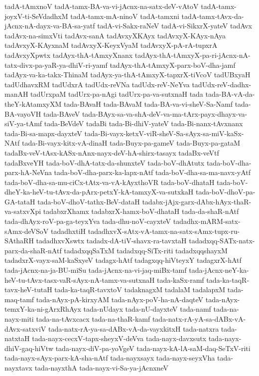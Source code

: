 {tadA-tAmxnoV
tadA-tamx-BA-va-vi-jAcnx-na-satx-deV-vAtoV
tadA-tamx-joyxV-ti-SeVdadhxM
tadA-tamx-mA-ninoV
tadA-tamxni
tadA-tamx-tAvx-da-jAcnx-nA-dayx-va-BA-sa-yatf
tadA-vi-Sakx-raNeV
tadA-vi-SikxrX-yateV
tadAvx
tadAvx-na-simxVti
tadAvx-sanA
tadAvxyXKAyx
tadAvxyX-KAyx-nAya
tadAvxyX-KAyxnaM
tadAvxyX-KeyxVyaM
tadAvxyX-pA-rA-tupxrA
tadAvxyXpwtx
tadAyx-thA-tAmxyXnanx
tadAyx-thA-tAmxyX-pa-ri-jAcnx-nA-tatx-divx-pa-yaR-ya-dhiV-ri-yamf
tadAyx-thA-tAmxyX-parx-boV-dha-jamf
tadAyx-va-ka-takx-ThinaM
tadAyx-ya-thA-tAmxyX-tapxrX-tiVcoV
tadUBxyaH
tadUdhavxRM
tadUdxrA
tadUdx-reVNa
tadUdx-reV-NeYva
tadUdx-reV-dadhx-manAH
tadUrxpaM
tadUrx-pa-nAgi
tadUrx-pa-va-sutxnaH
tada
tada-BA-vA-da-theY-kAtamxyXM
tada-BAvaH
tada-BAvaM
tada-BA-va-vi-sheV-Sa-Namf
tada-BA-vayoVH
tada-BAveV
tada-BAyx-sa-va-shA-deV-va-ma-tArx-payx-dhayx-va-siV-ya-tAmf
tada-BeVdeV
tadaBi
tada-Bi-dhiV-yateV
tada-Bi-nanx-tAvxnanx
tada-Bi-sa-mapx-dayxteV
tada-Bi-vayx-ketxV-viR-sheV-Sa-sAyx-sa-miV-kaSx-NAtf
tada-Bi-vayx-kitx-vA-dinaH
tada-Buyx-pa-gameV
tada-Buyx-pa-gataM
tadaBx-veV-tAsx-kASx-nAnx-nayx-deV-hA-shirx-tasayx
tadaBx-veVtf
tadaBxveYH
tada-boV-dhA-tatx-da-shunxteV
tada-boV-dhAtutx
tada-boV-dha-parx-hA-NeVna
tada-boV-dha-parx-ka-lapx-nAtf
tada-boV-dha-sa-ma-navx-yAtf
tada-boV-dha-sa-mu-ciCx-tAtx-va-vA-kAyxthoVR
tada-boV-dhataH
tada-boV-dheY-ka-heV-tu-tAvx-da-pArx-petxY-kA-tamxyX-va-sutxkaH
tada-boV-dhoV-pa-GA-tataH
tada-boV-dhoV-tathx-BeV-dataH
tadabx-jAjx-garx-dAbx-hAyx-thaR-va-satxvXpi
tadabxrXhamx
tadabxrX-hamx-boV-dhataH
tada-da-shaR-nAtf
tada-dhAyx-roV-pa-ga-teyxYva
tada-dhu-noV-cayxteV
tadadhx-mARM-satx-sAmx-deVSoV
tadadhxtiH
tadadhxvX-sAtx-vA-tamx-na-satx-sAmx-tupx-ru-SAthaRH
tadadhxvXswtx
tadadx-dA-tiV-shavx-ra-tavxtaH
tadadxqq-SATx-natx-parx-da-shaR-nAtf
tadadxqqSaTxM
tadadxqq-SiTx-riti
tadadxqqshayxM
tadadxrX-vayx-saM-kaSxyeV
tadagx-hAtf
tadagxqq-hiVteyxY
tadagxrX-hAtf
tada-jAcnx-na-ja-BU-miSu
tada-jAcnx-na-vi-jaq-miBx-tamf
tada-jAcnx-neY-ka-heV-tu-tAvx-tasx-vaR-sAyx-nA-tamx-va-sutxnaH
tada-kaSx-ramf
tada-ka-taqR-tavx-heV-tutaH
tada-ka-taqR-tavxtoV
tadaknagxM
tadalaM
tadalapxM
tada-maq-tamf
tada-nAyx-pA-kirxyAM
tada-nAyx-poV-ha-nA-daqteV
tada-nAyx-temxY-ka-ni-gArxRhAyx
tada-nUdayx
tada-nU-dayxteV
tada-namf
tada-na-nayx-miti
tada-na-tAvxcacx
tada-na-thaR-kamf
tada-natx-rA-yA-sa-dABx-vA-dAvx-satxviV
tada-natx-rA-ya-sa-dABx-vA-da-vayxkitxH
tada-natxra
tada-natxtaH
tada-nayx-cecxV-tapx-sheyxV-deVva
tada-nayx-davxsutx
tada-nayx-dhiV-gaq-hiVtw
tada-nayx-diV-pa-yoVgeV
tada-nayx-kA-lA-saM-daq-SeTxV-riti
tada-nayx-sAyx-parx-kA-sha-nAtf
tada-nayxsayx
tada-nayx-seyxVha
tada-nayxtavx
tada-nayxthA
tada-nayx-vi-Sa-ya-jAcnxneV
}
